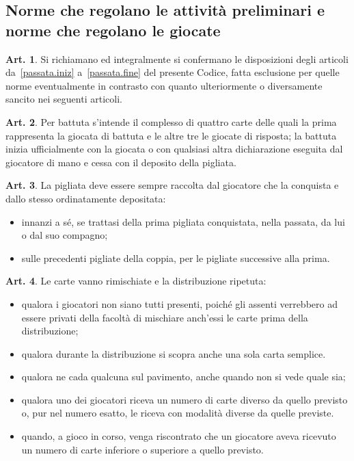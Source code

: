 \documentclass[italian,a4paper]{book}
\theoremstyle{definition}
\newtheorem{art}{Art.}
\newenvironment{packeditem}{
\begin{itemize}
  \setlength{\itemsep}{1pt}
  \setlength{\parskip}{0pt}
  \setlength{\parsep}{0pt}
}{\end{itemize}}
\begin{document}
\subsection{Norme che regolano le attività preliminari e norme che regolano le giocate}
\begin{art}
Si richiamano ed integralmente si confermano le disposizioni degli articoli
da~\ref{passata.iniz} a~\ref{passata.fine} del presente Codice, fatta esclusione per quelle norme eventualmente in contrasto con quanto ulteriormente o diversamente sancito nei seguenti articoli.
\end{art}
\begin{art}
Per battuta s'intende il complesso di quattro carte delle quali la prima rappresenta la giocata di battuta e le altre tre le giocate di risposta; la battuta inizia ufficialmente con la giocata o con qualsiasi altra dichiarazione eseguita dal giocatore di mano e cessa con il deposito della pigliata.
\end{art}
\begin{art}
La pigliata deve essere sempre raccolta dal giocatore che la conquista e dallo stesso ordinatamente depositata:
\begin{packeditem}
\item innanzi a sé, se trattasi della prima pigliata conquistata, nella passata, da lui o dal suo compagno;
\item sulle precedenti pigliate della coppia, per le pigliate successive alla prima.
    \end{packeditem}
\end{art}
\begin{art}
Le carte vanno rimischiate e la distribuzione ripetuta:
\begin{packeditem}
\item    qualora i giocatori non siano tutti presenti, poiché gli assenti verrebbero ad essere privati della facoltà di mischiare anch'essi le carte prima della distribuzione;
\item    qualora durante la distribuzione si scopra anche una sola carta semplice.
\item    qualora ne cada qualcuna sul pavimento, anche quando non si vede quale sia;
\item    qualora uno dei giocatori riceva un numero di carte diverso da quello previsto o, pur nel numero esatto, le riceva con modalità diverse da quelle previste.
\item      quando, a gioco in corso, venga riscontrato che un giocatore aveva ricevuto un numero di carte inferiore o superiore a quello previsto.
    \end{packeditem}
\end{art}
\end{document}
